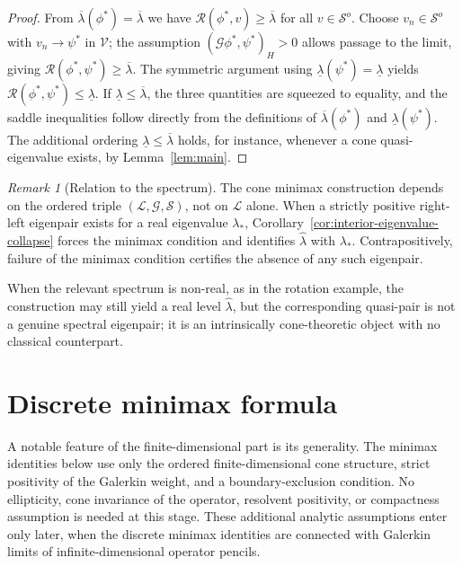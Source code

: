 \documentclass[preprint,10pt]{elsarticle}
\theoremstyle{plain}
\theoremstyle{definition}
\theoremstyle{remark}
\newtheorem{remark}{Remark}
\begin{document}
\begin{proof}
	From $\overline{\lambda}(\phi^{*})=\overline{\lambda}$ we have
	$\mathcal{R}(\phi^{*},v)\geq\overline{\lambda}$ for all $v\in\mathcal{S}^{o}$.
	Choose $v_{n}\in\mathcal{S}^{o}$ with $v_{n}\to\psi^{*}$ in $\mathcal{V}$;
	the assumption $(\mathcal{G}\phi^{*},\psi^{*})_{H}>0$ allows passage to the
	limit, giving $\mathcal{R}(\phi^{*},\psi^{*})\geq\overline{\lambda}$.
	The symmetric argument using $\underline{\lambda}(\psi^{*})=\underline{\lambda}$
	yields $\mathcal{R}(\phi^{*},\psi^{*})\leq\underline{\lambda}$.
	If $\underline{\lambda}\leq\overline{\lambda}$, the three quantities are
	squeezed to equality, and the saddle inequalities follow directly from the
	definitions of $\overline{\lambda}(\phi^{*})$ and
	$\underline{\lambda}(\psi^{*})$. The additional ordering
	$\underline{\lambda}\leq\overline{\lambda}$ holds, for instance, whenever a
	cone quasi-eigenvalue exists, by Lemma~\ref{lem:main}.
\end{proof}

\begin{remark}[Relation to the spectrum]
	The cone minimax construction depends on the ordered triple
	$(\mathcal{L},\mathcal{G},\mathcal{S})$, not on $\mathcal{L}$ alone. When a
	strictly positive right-left eigenpair exists for a real eigenvalue
	$\lambda_{*}$, Corollary~\ref{cor:interior-eigenvalue-collapse} forces the
	minimax condition and identifies $\hat\lambda$ with $\lambda_{*}$.
	Contrapositively, failure of the minimax condition certifies the absence of
	any such eigenpair.
	
	When the relevant spectrum is non-real, as in the rotation example, the
	construction may still yield a real level $\hat\lambda$, but the corresponding
	quasi-pair is not a genuine spectral eigenpair; it is an intrinsically
	cone-theoretic object with no classical counterpart.
\end{remark}


\section{Discrete minimax formula}
\label{sec:approximation}

A notable feature of the finite-dimensional part is its generality. The
minimax identities below use only the ordered finite-dimensional cone
structure, strict positivity of the Galerkin weight, and a boundary-exclusion
condition. No ellipticity, cone invariance of the operator, resolvent
positivity, or compactness assumption is needed at this stage. These
additional analytic assumptions enter only later, when the discrete
minimax identities are connected with Galerkin limits of infinite-dimensional
operator pencils.
\end{document}
